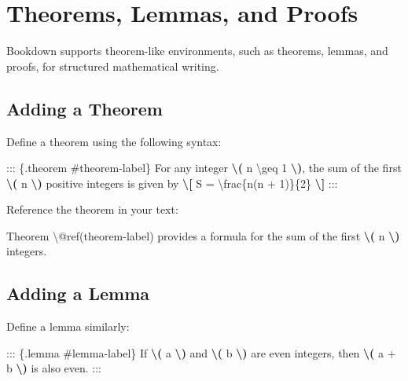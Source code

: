 \documentclass[
]{book}
\newenvironment{Shaded}{\begin{snugshade}}{\end{snugshade}}
\newcommand{\NormalTok}[1]{#1}
\newcommand{\SpecialCharTok}[1]{\textcolor[rgb]{0.81,0.36,0.00}{\textbf{#1}}}
\theoremstyle{definition}
\theoremstyle{definition}
\theoremstyle{definition}
\theoremstyle{definition}
\theoremstyle{remark}
\begin{document}
\section{Theorems, Lemmas, and Proofs}\label{theorems-lemmas-and-proofs}

Bookdown supports theorem-like environments, such as theorems, lemmas, and proofs, for structured mathematical writing.

\subsection{Adding a Theorem}\label{adding-a-theorem}

Define a theorem using the following syntax:

\begin{Shaded}
\begin{Highlighting}[]
\NormalTok{::: \{.theorem \#theorem{-}label\}}
\NormalTok{For any integer }\SpecialCharTok{\textbackslash{}(}\NormalTok{ n \textbackslash{}geq 1 }\SpecialCharTok{\textbackslash{})}\NormalTok{, the sum of the first }\SpecialCharTok{\textbackslash{}(}\NormalTok{ n }\SpecialCharTok{\textbackslash{})}\NormalTok{ positive integers is given by}
\SpecialCharTok{\textbackslash{}[}
\NormalTok{S = \textbackslash{}frac\{n(n + 1)\}\{2\}}
\SpecialCharTok{\textbackslash{}]}
\NormalTok{:::}
\end{Highlighting}
\end{Shaded}

Reference the theorem in your text:

\begin{Shaded}
\begin{Highlighting}[]
\NormalTok{Theorem \textbackslash{}@ref(theorem{-}label) provides a formula for the sum of the first }\SpecialCharTok{\textbackslash{}(}\NormalTok{ n }\SpecialCharTok{\textbackslash{})}\NormalTok{ integers.}
\end{Highlighting}
\end{Shaded}

\subsection{Adding a Lemma}\label{adding-a-lemma}

Define a lemma similarly:

\begin{Shaded}
\begin{Highlighting}[]
\NormalTok{::: \{.lemma \#lemma{-}label\}}
\NormalTok{If }\SpecialCharTok{\textbackslash{}(}\NormalTok{ a }\SpecialCharTok{\textbackslash{})}\NormalTok{ and }\SpecialCharTok{\textbackslash{}(}\NormalTok{ b }\SpecialCharTok{\textbackslash{})}\NormalTok{ are even integers, then }\SpecialCharTok{\textbackslash{}(}\NormalTok{ a + b }\SpecialCharTok{\textbackslash{})}\NormalTok{ is also even.}
\NormalTok{:::}
\end{Highlighting}
\end{Shaded}
\end{document}
